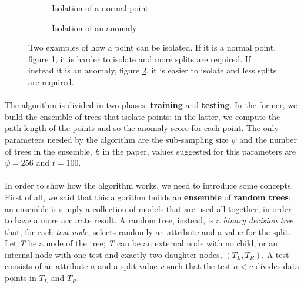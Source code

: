 \begin{figure}[h!]
     \centering
     \begin{subfigure}{0.49\textwidth}
         \centering
        
         \caption{Isolation of a normal point}
         \label{subfig:ifor-normal}
     \end{subfigure}
     \begin{subfigure}{0.49\textwidth}
         \centering
        
         \caption{Isolation of an anomaly}
         \label{subfig:ifor-anom}
     \end{subfigure}
     \caption{Two examples of how a point can be isolated. If it is a normal point, figure \ref{subfig:ifor-normal}, it is harder to isolate and more splits are required. If instead it is an anomaly, figure \ref{subfig:ifor-anom}, it is easier to isolate and less splits are required.}
     \label{fig:ifor_isol}
\end{figure}

\paragraph{}
The algorithm is divided in two phases: \textbf{training} and \textbf{testing}. In the former, we build the ensemble of trees that isolate points; in the latter, we compute the path-length of the points and so the anomaly score for each point. \newline
The only parameters needed by the algorithm are the sub-sampling size $\psi$ and the number of trees in the ensemble, \textit{t}; in the paper, values suggested for this parameters are $\psi = 256$ and $t = 100$.

\paragraph{}
In order to show how the algorithm works, we need to introduce some concepts. First of all, we said that this algorithm builds an \textbf{ensemble} of \textbf{random trees}; an ensemble is simply a collection of models that are used all together, in order to have a more accurate result. \newline
A random tree, instead, is a \textit{binary decision tree} that, for each \textit{test-node}, selects randomly an attribute and a value for the split. Let \textit{T} be a node of the tree; \textit{T} can be an external node with no child, or an internal-node with one test and exactly two daughter nodes, $(T_L, T_R)$. A test consists of an attribute $a$ and a split value $v$ such that the test $a < v$ divides data points in $T_L$ and $T_R$. \newline

